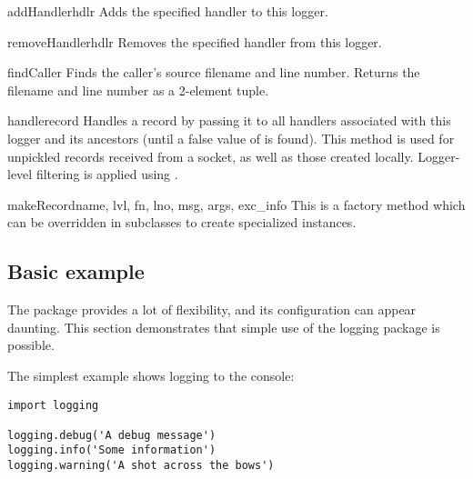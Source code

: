 \begin{methoddesc}{addHandler}{hdlr}
Adds the specified handler  to this logger.
\end{methoddesc}

\begin{methoddesc}{removeHandler}{hdlr}
Removes the specified handler  from this logger.
\end{methoddesc}

\begin{methoddesc}{findCaller}{}
Finds the caller's source filename and line number. Returns the filename
and line number as a 2-element tuple.
\end{methoddesc}

\begin{methoddesc}{handle}{record}
Handles a record by passing it to all handlers associated with this logger
and its ancestors (until a false value of  is found).
This method is used for unpickled records received from a socket, as well
as those created locally. Logger-level filtering is applied using
.
\end{methoddesc}

\begin{methoddesc}{makeRecord}{name, lvl, fn, lno, msg, args, exc_info
                               }
This is a factory method which can be overridden in subclasses to create
specialized  instances.
\end{methoddesc}

\subsection{Basic example \label{minimal-example}}


The  package provides a lot of flexibility, and its
configuration can appear daunting.  This section demonstrates that simple
use of the logging package is possible.

The simplest example shows logging to the console:

\begin{verbatim}
import logging

logging.debug('A debug message')
logging.info('Some information')
logging.warning('A shot across the bows')
\end{verbatim}


